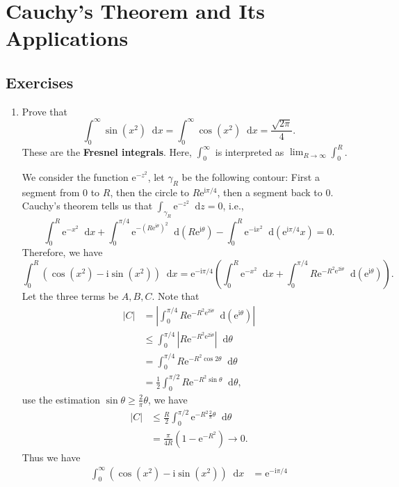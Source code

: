 \documentclass[11pt]{report}
\theoremstyle{mythm}
\let\oldendproof\endproof
\renewenvironment{proof}[1][\proofname]{%
  \oldproof[\normalfont \bfseries #1]%
}{\oldendproof}
\renewcommand*{\proofname}{Proof}
\theoremstyle{myans}
\newcommand{\mi}{\mathrm{i}}
\newcommand{\me}{\mathrm{e}}
\newcommand{\dd}{\mathop{}\!\mathrm{d}}
\begin{document}
\setcounter{chapter}{1}
\chapter{Cauchy's Theorem and Its Applications}

\section{Exercises}

\begin{enumerate}
  \item Prove that
  \[ \int_0^\infty \sin(x^2) \dd x = \int_0^\infty \cos(x^2)\dd x = \frac{\sqrt{2\pi}}{4}. \]
  These are the \textbf{Fresnel integrals}. Here, $\int_0^\infty$ is interpreted as $\lim_{R\to\infty}\int_0^R$.
  \begin{proof}
    We consider the function $\me^{-z^2}$, let $\gamma_R$ be the following contour: First a segment from
    $0$ to $R$, then the circle to $R\me^{\mi \pi/4}$, then a segment back to $0$. Cauchy's theorem tells
    us that $\int_{\gamma_R} \me^{-z^2}\dd z = 0$, i.e.,
    \[ \int_0^R \me^{-x^2}\dd x + \int_0^{\pi/4} \me^{-(R\me^{\mi \theta})^2} \dd (R\me^{\mi \theta})
    - \int_0^R \me^{-\mi x^2} \dd (\me^{\mi \pi/4}x) = 0. \]
    Therefore, we have
    \[ \int_0^R (\cos (x^2) - \mi \sin(x^2)) \dd x = \me^{-\mi \pi/4}
    \left(\int_0^R \me^{-x^2}\dd x+ \int_0^{\pi/4} R\me^{-R^2 \me^{2\mi \theta}} \dd(\me^{\mi\theta}) \right). \]
    Let the three terms be $A, B, C$. Note that
    \begin{align*}
      |C| &= \left|\int_0^{\pi/4} R\me^{-R^2 \me^{2\mi \theta}} \dd(\me^{\mi\theta})\right|\\
      &\leq \int_0^{\pi/4} \left|R \me^{-R^2 \me^{2\mi \theta}} \right| \dd \theta\\
      &= \int_0^{\pi/4} R \me^{-R^2 \cos 2\theta} \dd \theta\\
      &= \frac 12 \int_0^{\pi/2} R \me^{-R^2 \sin \theta} \dd \theta,
    \end{align*}
    use the estimation $\sin \theta \geq \frac 2 \pi \theta$, we have
    \begin{align*}
      |C| &\leq \frac R2 \int_0^{\pi/2} \me^{-R^2 \frac 2\pi \theta} \dd \theta\\
      &= \frac{\pi}{4R} (1 - \me^{-R^2}) \to 0.
    \end{align*}
    Thus we have
    \begin{align*}
      \int_0^\infty (\cos (x^2) - \mi \sin(x^2)) \dd x &= \me^{-\mi \pi/4}

\end{align*}
\end{proof}
\end{enumerate}
\end{document}
